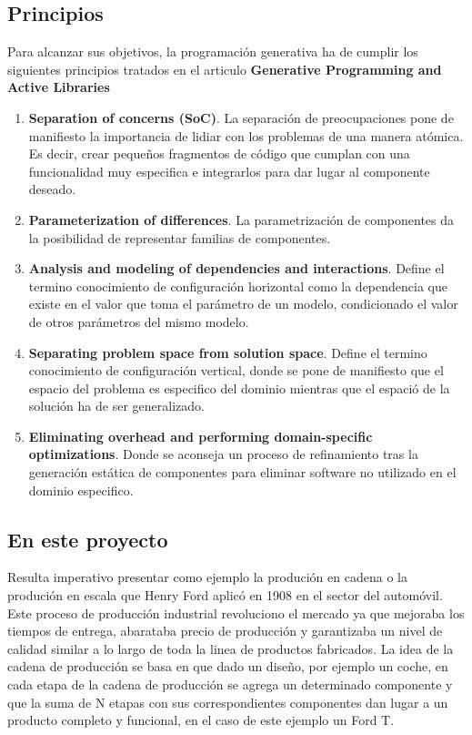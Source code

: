 \documentclass[a4paper,11pt]{book}
\begin{document}
\subsection{Principios}

Para alcanzar sus objetivos, la programación generativa ha de cumplir los siguientes principios tratados en el articulo \textbf{Generative Programming and Active Libraries}~\cite{gpl}

\begin{enumerate}
\item \textbf{Separation of concerns (SoC)}. La separación de preocupaciones pone de manifiesto la importancia de lidiar con los problemas de una manera atómica. Es decir, crear pequeños fragmentos de código que cumplan con una funcionalidad muy especifica e integrarlos para dar lugar al componente deseado.
\item \textbf{Parameterization of differences}.  La parametrización de componentes da la posibilidad de representar familias de componentes.
\item \textbf{Analysis and modeling of dependencies and interactions}.  Define el termino conocimiento de configuración horizontal como la dependencia que existe en el valor que toma el parámetro de un modelo, condicionado el valor de otros parámetros del mismo modelo.
\item \textbf{Separating problem space from solution space}.  Define el termino conocimiento de configuración vertical, donde se pone de manifiesto que el espacio del problema es especifico del dominio mientras que el espació de la solución ha de ser generalizado.
\item \textbf{Eliminating overhead and performing domain-specific optimizations}.  Donde se aconseja un proceso de refinamiento tras la generación estática de componentes para eliminar software no utilizado en el dominio especifico.
\end{enumerate}

\subsection{En este proyecto}

Resulta imperativo presentar como ejemplo  la produción en cadena o la produción en escala que Henry Ford aplicó en 1908 en el sector del automóvil. Este proceso de producción industrial revoluciono el mercado ya que mejoraba los tiempos de entrega, abarataba precio de producción y garantizaba un nivel de calidad similar a lo largo de toda la linea de productos fabricados. La idea de la cadena de producción se basa en que dado un diseño, por ejemplo un coche, en cada etapa de la cadena de producción  se agrega un determinado componente y que la suma de N etapas con sus correspondientes componentes dan lugar a un producto completo y funcional, en el caso de este ejemplo un Ford T. 
\end{document}
